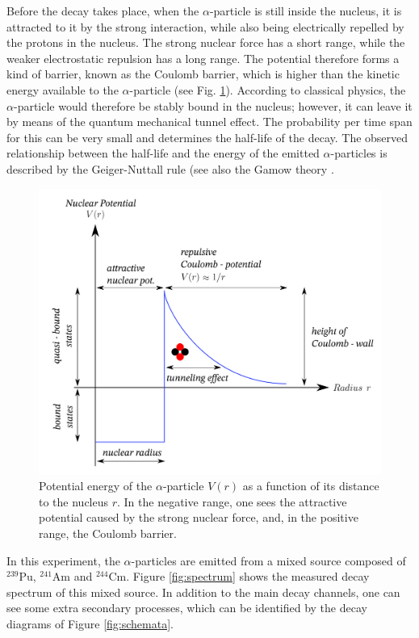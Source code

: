 Before the decay takes place, when the $\alpha$-particle is still inside the nucleus, it is attracted to it by the strong interaction, while also being electrically repelled by the protons in the nucleus. The strong nuclear force has a short range, while the weaker electrostatic repulsion has a long range. The potential therefore forms a kind of barrier, known as the Coulomb barrier, which is higher than the kinetic energy available to the $\alpha$-particle (see Fig. \ref{fig:coulomb-barrier}). According to classical physics, the $\alpha$-particle would therefore be stably bound in the nucleus; however, it can leave it by means of the quantum mechanical tunnel effect. The probability per time span for this can be very small and determines the half-life of the decay. The observed relationship between the half-life and the energy of the emitted $\alpha$-particles is described by the Geiger-Nuttall rule (see also the Gamow theory \cite{dewiki:240085809}.
\begin{figure}[h]
	\centering
	\includegraphics[width=0.6\linewidth]{img/tunneleffect_alpha_decay.png}
	\caption{Potential energy of the $\alpha$-particle $V(r)$ as a function of its distance to the nucleus $r$. In the negative range, one sees the attractive potential caused by the strong nuclear force, and, in the positive range, the Coulomb barrier. \cite{img:coulombwall}}
	\label{fig:coulomb-barrier}
\end{figure}

In this experiment, the $\alpha$-particles are emitted from a mixed source composed of $^{239}$Pu, $^{241}$Am and $^{244}$Cm. Figure \ref{fig:spectrum} shows the measured decay spectrum of this mixed source. In addition to the main decay channels, one can see some extra secondary processes, which can be identified by the decay diagrams of Figure \ref{fig:schemata}.

